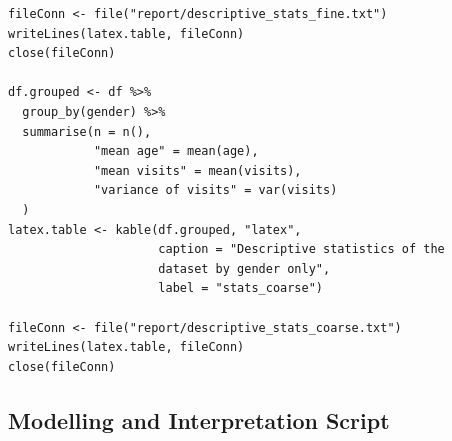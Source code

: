 \documentclass[a4paper,11pt]{article}
\begin{document}
\begin{verbatim}
fileConn <- file("report/descriptive_stats_fine.txt")
writeLines(latex.table, fileConn)
close(fileConn)

df.grouped <- df %>%
  group_by(gender) %>%
  summarise(n = n(),
            "mean age" = mean(age),
            "mean visits" = mean(visits),
            "variance of visits" = var(visits)
  )
latex.table <- kable(df.grouped, "latex",
                     caption = "Descriptive statistics of the
                     dataset by gender only",
                     label = "stats_coarse")

fileConn <- file("report/descriptive_stats_coarse.txt")
writeLines(latex.table, fileConn)
close(fileConn)
\end{verbatim}

\subsection{Modelling and Interpretation Script}
\end{document}
